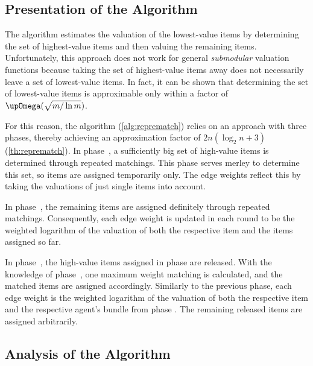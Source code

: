\subsection{Presentation of the Algorithm}
\label{subsec:reprematch:presentation}

The algorithm \SMatch{} estimates the valuation of the lowest-value items by determining the set of highest-value items and then valuing the remaining items.
Unfortunately, this approach does not work for general \emph{submodular} valuation functions because taking the set of highest-value items away does not necessarily leave a set of lowest-value items.
In fact, it can be shown \cite{submodular_low_value} that determining the set of lowest-value items is approximable only within a factor of \(\bigomega(\sqrt{m / \ln m})\).

For this reason, the algorithm \RepReMatch{} (\cref{alg:reprematch}) relies on an approach with three phases, thereby achieving an approximation factor of \(2n(\log_2 n + 3)\) (\cref{th:reprematch}).
In phase~\phasei, a sufficiently big set of high-value items is determined through repeated matchings.
This phase serves merley to determine this set, so items are assigned temporarily only.
The edge weights reflect this by taking the valuations of just single items into account.

In phase~\phaseii, the remaining items are assigned definitely through repeated matchings.
Consequently, each edge weight is updated in each round to be the weighted logarithm of the valuation of both the respective item and the items assigned so far.

In phase~\phaseiii, the high-value items assigned in phase \phasei{} are released.
With the knowledge of phase~\phaseii, one maximum weight matching is calculated, and the matched items are assigned accordingly.
Similarly to the previous phase, each edge weight is the weighted logarithm of the valuation of both the respective item and the respective agent's bundle from phase \phaseii.
The remaining released items are assigned arbitrarily.

\subsection{Analysis of the Algorithm}
\label{subsec:reprematch:analysis}

